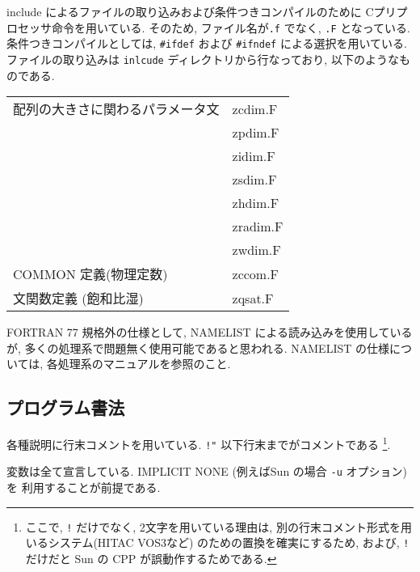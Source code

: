 \・include によるファイルの取り込みおよび条件つきコンパイルのために
Cプリプロセッサ命令を用いている. 
そのため, ファイル名が{\tt *.f} でなく, {\tt *.F} となっている.
条件つきコンパイルとしては, 
{\tt \#ifdef} および {\tt \#ifndef} による選択を用いている.
ファイルの取り込みは {\tt inlcude} ディレクトリから行なっており,
以下のようなものである. 
\begin{center}
  \begin{tabular}{ll}
    配列の大きさに関わるパラメータ文 & zcdim.F \\
                                     & zpdim.F \\
                                     & zidim.F \\
                                     & zsdim.F \\
                                     & zhdim.F \\
                                     & zradim.F \\
                                     & zwdim.F \\
    COMMON 定義(物理定数)            & zccom.F \\
    文関数定義 (飽和比湿)            & zqsat.F \\
  \end{tabular}
\end{center}

\・FORTRAN 77 規格外の仕様として,
  NAMELIST による読み込みを使用しているが,
  多くの処理系で問題無く使用可能であると思われる.
  NAMELIST の仕様については, 各処理系のマニュアルを参照のこと.

\subsection{プログラム書法}

\・各種説明に行末コメントを用いている. 
  \verb+!"+ 以下行末までがコメントである 
  \footnote{ここで,  \verb+!+ だけでなく, 2文字を用いている理由は, 
            別の行末コメント形式を用いるシステム(HITAC VOS3など)
            のための置換を確実にするため, および,
            \verb+!+ だけだと Sun の CPP が誤動作するためである.}.

\・変数は全て宣言している. 
  IMPLICIT NONE (例えばSun の場合 {\tt -u} オプション)を
  利用することが前提である.

